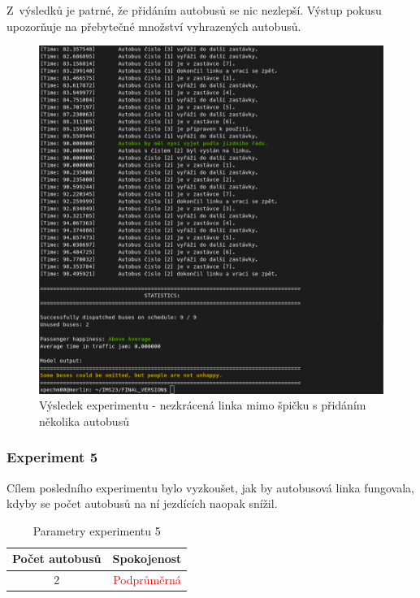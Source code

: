 \documentclass[a4paper]{article}
\begin{document}
                Z~výsledků je patrné, že přidáním autobusů se nic nezlepší. Výstup pokusu upozorňuje na přebytečné množství vyhrazených autobusů.

                 \begin{figure}[H]
                \includegraphics[scale=0.48, keepaspectratio]{fig/ims_bus4.png}
                \caption{Výsledek experimentu  - nezkrácená linka mimo špičku s přidáním několika autobusů}
                \label{fig:experiment4}
                    \end{figure}

            \newpage
            \subsubsection{Experiment 5}
            \label{subsubsec:experiment5}

                Cílem posledního experimentu bylo vyzkoušet, jak by autobusová linka fungovala, kdyby se počet autobusů na ní jezdících naopak snížil.
    
                \begin{table}[H]
                    \centering
                    \begin{tabular}{ | c | c |}
                        \hline
                        Počet autobusů & Spokojenost\\
                        \hline
                        \hline
                        2 & \textcolor{red}{Podprůměrná} \\
                        \hline
                    \end{tabular}
                    \caption{Parametry experimentu 5}
                    \label{tab:experiment5}
                \end{table}
\end{document}
